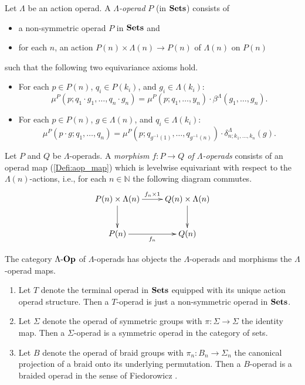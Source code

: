 \begin{Defi}\label{Defi:lamop}
  Let $\Lambda$ be an action operad. A \textit{$\Lambda$-operad} $P$ (in $\mathbf{Sets}$) consists of
    \begin{itemize}
      \item a non-symmetric operad $P$ in $\mathbf{Sets}$ and
      \item for each $n$, an action $P(n) \times \Lambda(n) \rightarrow P(n)$ of $\Lambda(n)$ on $P(n)$
    \end{itemize}
such that the following two equivariance axioms hold.
  \begin{itemize}
    \item For each $p \in P(n)$, $q_i \in P(k_i)$, and $g_i \in \Lambda(k_i)$:
  \[
    \mu^{P}(p; q_{1} \cdot g_{1}, \ldots, q_{n} \cdot g_{n}) = \mu^{P}(p; q_{1}, \ldots, y_{n}) \cdot \beta^{\Lambda}(g_{1}, \ldots, g_{n}).
  \]
    \item For each $p \in P(n)$, $g \in \Lambda(n)$, and $q_i \in \Lambda(k_i)$:
  \[
    \mu^{P}(p \cdot g; q_{1}, \ldots, q_{n}) = \mu^{P}\left(p; q_{g^{-1}(1)}, \ldots, q_{g^{-1}(n)}\right) \cdot \delta_{n;k_1,\ldots,k_n}^{\Lambda}(g).
  \]
  \end{itemize}
\end{Defi}


\begin{Defi}\label{Defi:aop_map}
Let $P$ and $Q$ be $\Lambda$-operads. A \emph{morphism $f \colon P \rightarrow Q$ of $\Lambda$-operads} consists of an operad map (\ref{Defi:aop_map}) which is levelwise equivariant with respect to the $\Lambda(n)$-actions, i.e., for each $n \in \mathbb{N}$ the following diagram commutes.
  \[
    \xy
      (0,0)*+{P(n) \times \Lambda(n)}="00";
      (30,0)*+{Q(n) \times \Lambda(n)}="10";
      (30,-15)*+{Q(n)}="11";
      (0,-15)*+{P(n)}="01";
      {\ar^{f_n \times 1} "00";"10"};
      {\ar "10";"11"};
      {\ar "00";"01"};
      {\ar_{f_n} "01";"11"};
    \endxy
  \]
\end{Defi}

\begin{Defi}
  The category $\Lambda\mbox{-}\mathbf{Op}$ of $\Lambda$-operads has objects the $\Lambda$-operads and morphisms the $\Lambda$-operad maps.
\end{Defi}

\begin{example}
  \begin{enumerate}
    \item Let $T$ denote the terminal operad in $\mathbf{Sets}$ equipped with its unique action operad structure. Then a $T$-operad is just a non-symmetric operad in $\mathbf{Sets}$.
    \item Let $\Sigma$ denote the operad of symmetric groups with $\pi \colon \Sigma \rightarrow \Sigma$ the identity map. Then a $\Sigma$-operad is a symmetric operad in the category of sets.
    \item Let $B$ denote the operad of braid groups with $\pi_{n} \colon B_{n} \rightarrow \Sigma_{n}$ the canonical projection of a braid onto its underlying permutation. Then a $B$-operad is a braided operad in the sense of Fiedorowicz \cite{fie-br}.
  \end{enumerate}
\end{example}

